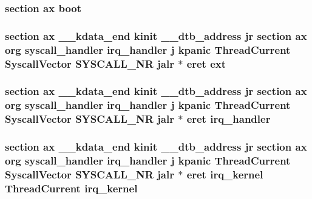 \hypertarget{mips_2entry_8S_a337fb5bad1df922a0879d51e6c2c399c}{
\subsubsection[{boot}]{\setlength{\rightskip}{0pt plus 5cm}section ax boot}}\label{mips_2entry_8S_a337fb5bad1df922a0879d51e6c2c399c}
\hypertarget{mips_2entry_8S_aae6ab066bc5ab6b3da2216daf346ae3a}{
\subsubsection[{ext}]{\setlength{\rightskip}{0pt plus 5cm}section ax {\bf \-\_\-\-\_\-kdata\-\_\-end} {\bf kinit} \-\_\-\-\_\-dtb\-\_\-address jr section ax org {\bf syscall\-\_\-handler} {\bf irq\-\_\-handler} j {\bf kpanic} {\bf Thread\-Current} {\bf Syscall\-Vector} {\bf S\-Y\-S\-C\-A\-L\-L\-\_\-\-N\-R} jalr $\ast$ eret ext}}\label{mips_2entry_8S_aae6ab066bc5ab6b3da2216daf346ae3a}
\hypertarget{mips_2entry_8S_a9d2aa3bc4e44a8ffda50e5b21ab6fb59}{
\subsubsection[{irq\-\_\-handler}]{\setlength{\rightskip}{0pt plus 5cm}section ax {\bf \-\_\-\-\_\-kdata\-\_\-end} {\bf kinit} \-\_\-\-\_\-dtb\-\_\-address jr section ax org {\bf syscall\-\_\-handler} irq\-\_\-handler j {\bf kpanic} {\bf Thread\-Current} {\bf Syscall\-Vector} {\bf S\-Y\-S\-C\-A\-L\-L\-\_\-\-N\-R} jalr $\ast$ eret irq\-\_\-handler}}\label{mips_2entry_8S_a9d2aa3bc4e44a8ffda50e5b21ab6fb59}
\hypertarget{mips_2entry_8S_aa28b32f4e79871f57f2456daed530508}{
\subsubsection[{irq\-\_\-kernel}]{\setlength{\rightskip}{0pt plus 5cm}section ax {\bf \-\_\-\-\_\-kdata\-\_\-end} {\bf kinit} \-\_\-\-\_\-dtb\-\_\-address jr section ax org {\bf syscall\-\_\-handler} {\bf irq\-\_\-handler} j {\bf kpanic} {\bf Thread\-Current} {\bf Syscall\-Vector} {\bf S\-Y\-S\-C\-A\-L\-L\-\_\-\-N\-R} jalr $\ast$ eret irq\-\_\-kernel {\bf Thread\-Current} irq\-\_\-kernel}}\label{mips_2entry_8S_aa28b32f4e79871f57f2456daed530508}
